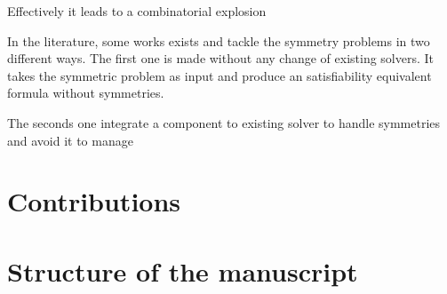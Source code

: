 Effectively it leads to a combinatorial explosion




In the literature, some works exists and tackle the symmetry problems in two different ways.
The first one is made without any change of existing solvers. It takes the symmetric problem as input
and produce an satisfiability equivalent formula without symmetries.

The seconds one integrate a component to existing solver to handle symmetries and avoid it to manage

\section{Contributions}

\section{Structure of the manuscript}


